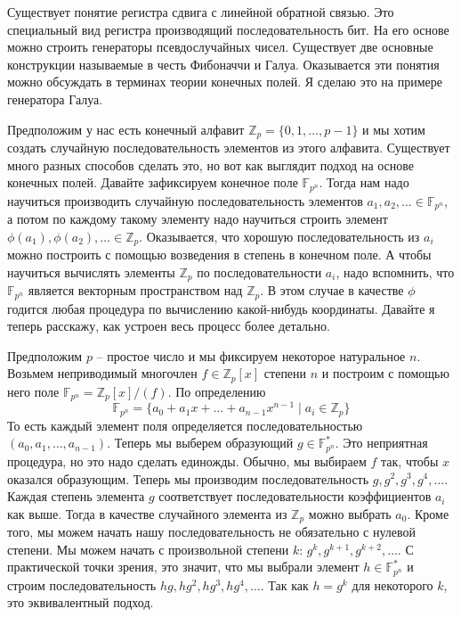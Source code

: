 Существует понятие регистра сдвига с линейной обратной связью.
Это специальный вид регистра производящий последовательность бит.
На его основе можно строить генераторы псевдослучайных чисел.
Существует две основные конструкции называемые в честь Фибоначчи и Галуа.
Оказывается эти понятия можно обсуждать в терминах теории конечных полей.
Я сделаю это на примере генератора Галуа.

Предположим у нас есть конечный алфавит $\mathbb Z_p = \{0,1,\ldots,p-1\}$ и мы хотим создать случайную последовательность элементов из этого алфавита.
Существует много разных способов сделать это, но вот как выглядит подход на основе конечных полей.
Давайте зафиксируем конечное поле $\mathbb F_{p^n}$.
Тогда нам надо научиться производить случайную последовательность элементов $a_1,a_2,\ldots\in \mathbb F_{p^n}$, а потом по каждому такому элементу надо научиться строить элемент $\phi(a_1),\phi(a_2),\ldots\in \mathbb Z_p$.
Оказывается, что хорошую последовательность из $a_i$ можно построить с помощью возведения в степень в конечном поле.
А чтобы научиться вычислять элементы $\mathbb Z_p$ по последовательности $a_i$, надо вспомнить, что $\mathbb F_{p^n}$ является векторным пространством над $\mathbb Z_p$.
В этом случае в качестве $\phi$ годится любая процедура по вычислению какой-нибудь координаты.
Давайте я теперь расскажу, как устроен весь процесс более детально.

Предположим $p$ -- простое число и мы фиксируем некоторое натуральное $n$.
Возьмем неприводимый многочлен $f\in \mathbb Z_p[x]$ степени $n$ и построим с помощью него поле $\mathbb F_{p^n} = \mathbb Z_p[x]/(f)$.
По определению
\[
\mathbb F_{p^n} = \{a_0 + a_1 x + \ldots + a_{n-1}x^{n-1}\mid a_i\in \mathbb Z_p\}
\]
То есть каждый элемент поля определяется последовательностью $(a_0, a_1,\ldots,a_{n-1})$.
Теперь мы выберем образующий $g\in \mathbb F_{p^n}^*$.
Это неприятная процедура, но это надо сделать единожды.
Обычно, мы выбираем $f$ так, чтобы $x$ оказался образующим.
Теперь мы производим последовательность $g, g^2, g^3, g^4,\ldots$.
Каждая степень элемента $g$ соответствует последовательности коэффициентов $a_i$ как выше.
Тогда в качестве случайного элемента из $\mathbb Z_p$ можно выбрать $a_0$.
Кроме того, мы можем начать нашу последовательность не обязательно с нулевой степени.
Мы можем начать с произвольной степени $k$: $g^k, g^{k+1}, g^{k+2}, \ldots$.
С практической точки зрения, это значит, что мы выбрали элемент $h\in \mathbb F_{p^n}^*$ и строим последовательность $hg, hg^2, hg^3, hg^4,\ldots$.
Так как $h = g^k$ для некоторого $k$, это эквивалентный подход.

